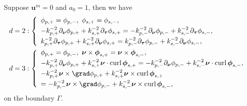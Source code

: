\documentclass[final,reqno]{siamltex}
\newcommand{\pa}{\partial}
\newcommand{\curl}{{\rm curl\,}}
\begin{document}
\begin{corollary}\label{cor2.3}
	Suppose $\mathbf{u}^{in}=0$ and $a_0=1$, then we have 
	\begin{align*}
	  &d=2:\left\{
	  \begin{array}{l}
	  	\phi_{p,+}=\phi_{p,-},~\phi_{s,+}=\phi_{s,-}, \\ [1mm]
	  	-k_{p,+}^{-2}\pa_{\boldsymbol{\nu}}\phi_{p,+}+k_{s,+}^{-2}\pa_{\boldsymbol{\tau}}\phi_{s,+}=-k_{p,-}^{-2}\pa_{\boldsymbol{\nu}}\phi_{p,-}+k_{s,-}^{-2}\pa_{\boldsymbol{\tau}}\phi_{s,-}, \\ [1mm]
	   k_{p,+}^{-2}\pa_{\boldsymbol{\tau}}\phi_{p,+}+k_{s,+}^{-2}\pa_{\boldsymbol{\nu}}\phi_{s,+}=k_{p,-}^{-2}\pa_{\boldsymbol{\tau}}\phi_{p,-}+k_{s,-}^{-2}\pa_{\boldsymbol{\nu}}\phi_{s,-},
	  \end{array}
	  \right. \\
	&d=3:\left\{
	\begin{array}{l}
		\phi_{p,+}=\phi_{p,-},~\boldsymbol{\nu}\times\boldsymbol{\phi}_{s,+}=\boldsymbol{\nu}\times\boldsymbol{\phi}_{s,-}, \\ [1mm]
		-k_{p,+}^{-2}\pa_{\boldsymbol{\nu}}\phi_{p,+}+k_{s,+}^{-2}\boldsymbol{\nu}\cdot\curl\boldsymbol{\phi}_{s,+}=-k_{p,-}^{-2}\pa_{\boldsymbol{\nu}}\phi_{p,-}+k_{s,-}^{-2}\boldsymbol{\nu}\cdot\curl\boldsymbol{\phi}_{s,-}, \\ [1mm]
		-k_{p,+}^{-2}\boldsymbol{\nu}\times\grad\phi_{p,+}+k_{s,+}^{-2}\boldsymbol{\nu}\times\curl\boldsymbol{\phi}_{s,+} \\ [1mm]
		=-k_{p,-}^{-2}\boldsymbol{\nu}\times\grad\phi_{p,-}+k_{s,-}^{-2}\boldsymbol{\nu}\times\curl\boldsymbol{\phi}_{s,-}, 
	\end{array}
	\right.
	\end{align*}
	on the boundary $\Gamma$. 
\end{corollary}
\end{document}
